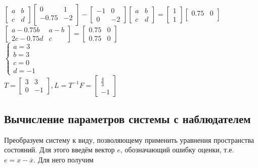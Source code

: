 	\noindent$\begin{bmatrix} a & b \\ c & d \end{bmatrix}
	\begin{bmatrix}
	0 & 1 \\
	-0.75 & -2 \\
	\end{bmatrix}-
	\begin{bmatrix} -1 & 0 \\ 0 & -2 \end{bmatrix}
	\begin{bmatrix} a & b \\ c & d \end{bmatrix}=
	\begin{bmatrix} 1 \\ 1 \end{bmatrix}
	\begin{bmatrix}
	0.75 & 0 \\
	\end{bmatrix}$\\
	$\begin{bmatrix} a - 0.75b & a-b \\ 2c - 0.75d & c \end{bmatrix}=
	\begin{bmatrix} 0.75 & 0 \\ 0.75 & 0 \end{bmatrix}$\\
$		\begin{cases}
		\text{$a=3$} \\
		\text{$b=3$} \\
		\text{$c=0$} \\
		\text{$d=-1$} 
	\end{cases}
$\\
	$T=\begin{bmatrix} 3 & 3 \\ 0 & -1 \end{bmatrix}, L=T^{-1}F=\begin{bmatrix} \frac{4}{3} \\ -1 \end{bmatrix}$
\newpage
\subsection{Вычисление параметров системы с наблюдателем}

Преобразуем систему к виду, позволяющему применить уравнения пространства состояний. Для этого введём вектор $e$, обозначающий ошибку оценки, т.е. $e=x-\overline{x}$. Для него получим\\

